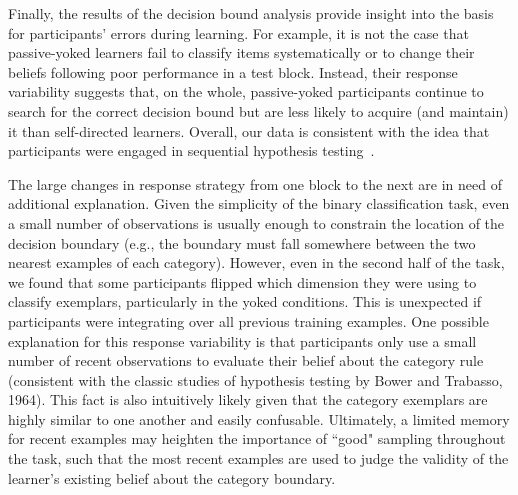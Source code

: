 \documentclass[3p,twocolumn,authoryear,10pt]{elsarticle}
\begin{document}
Finally, the results of the decision bound analysis provide insight into the basis for participants' errors during learning. For example, it is not the case that passive-yoked learners fail to classify items systematically or to change their beliefs following poor performance in a test block.  Instead, their response variability suggests that, on the whole, passive-yoked participants continue to search for the correct decision bound but are less likely to acquire (and maintain) it than self-directed learners. Overall, our data is consistent with the idea that participants were engaged in sequential hypothesis testing~\citep{Bower:1964kn,gregg1967process,Nosofsky-1994ck,nosofsky1998rule}.

The large changes in response strategy from one block to the next are in need of additional explanation. Given the simplicity of the binary classification task, even a small number of observations is usually enough to constrain the location of the decision boundary (e.g., the boundary must fall somewhere between the two nearest examples of each category).  However, even in the second half of the task, we found that some participants flipped which dimension they were using to classify exemplars, particularly in the yoked conditions.  This is unexpected if participants were integrating over all previous training examples.  One possible explanation for this response variability is that participants only use a small number of recent observations to evaluate their belief about the category rule (consistent with the classic studies of hypothesis testing by Bower and Trabasso, 1964). This fact is also intuitively likely given that the category exemplars are highly similar to one another and easily confusable.  Ultimately, a limited memory for recent examples may heighten the importance of ``good" sampling throughout the task, such that the most recent examples are used to judge the validity of the learner's existing belief about the category boundary.
 \nocite{Bower:1964kn}
 




\end{document}
